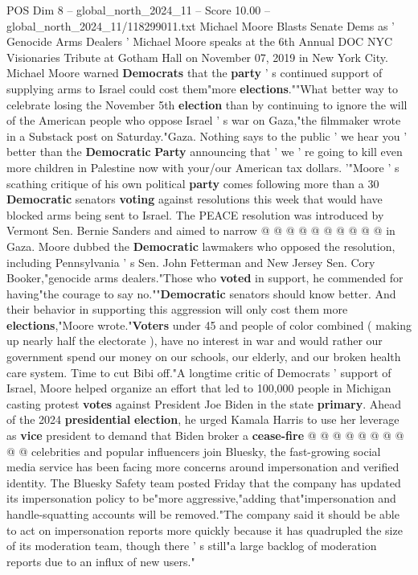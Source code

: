\begin{textsample}{POS Dim 8 – global\_north\_2024\_11 – Score 10.00 – global\_north\_2024\_11/118299011.txt}  \label{ex:f8_pos_156}
Michael Moore Blasts Senate Dems as ' Genocide Arms Dealers ' Michael Moore speaks at the 6th Annual DOC NYC Visionaries Tribute at Gotham Hall on November 07, 2019 in New York City.
Michael Moore warned \textbf{Democrats} that the \textbf{party} ' s continued support of supplying arms to Israel could cost them"more \textbf{elections}.""What better way to celebrate losing the November 5th \textbf{election} than by continuing to ignore the will of the American people who oppose Israel ' s war on Gaza,"the filmmaker wrote in a Substack post on Saturday."Gaza.
Nothing says to the public ' we hear you ' better than the \textbf{Democratic} \textbf{Party} announcing that ' we ' re going to kill even more children in Palestine now with your/our American tax dollars. '"Moore ' s scathing critique of his own political \textbf{party} comes following more than a 30 \textbf{Democratic} senators \textbf{voting} against resolutions this week that would have blocked arms being sent to Israel.
The PEACE resolution was introduced by Vermont Sen.
Bernie Sanders and aimed to narrow @ @ @ @ @ @ @ @ @ @ in Gaza.
Moore dubbed the \textbf{Democratic} lawmakers who opposed the resolution, including Pennsylvania ' s Sen.
John Fetterman and New Jersey Sen.
Cory Booker,"genocide arms dealers."Those who \textbf{voted} in support, he commended for having"the courage to say no.""\textbf{Democratic} senators should know better.
And their behavior in supporting this aggression will only cost them more \textbf{elections},"Moore wrote."\textbf{Voters} under 45 and people of color combined ( making up nearly half the electorate ), have no interest in war and would rather our government spend our money on our schools, our elderly, and our broken health care system.
Time to cut Bibi off."A longtime critic of Democrats ' support of Israel, Moore helped organize an effort that led to 100,000 people in Michigan casting protest \textbf{votes} against President Joe Biden in the state \textbf{primary}.
Ahead of the 2024 \textbf{presidential} \textbf{election}, he urged Kamala Harris to use her leverage as \textbf{vice} president to demand that Biden broker a \textbf{cease-fire} @ @ @ @ @ @ @ @ @ @ celebrities and popular influencers join Bluesky, the fast-growing social media service has been facing more concerns around impersonation and verified identity.
The Bluesky Safety team posted Friday that the company has updated its impersonation policy to be"more aggressive,"adding that"impersonation and handle-squatting accounts will be removed."The company said it should be able to act on impersonation reports more quickly because it has quadrupled the size of its moderation team, though there ' s still"a large backlog of moderation reports due to an influx of new users."

\end{textsample}
